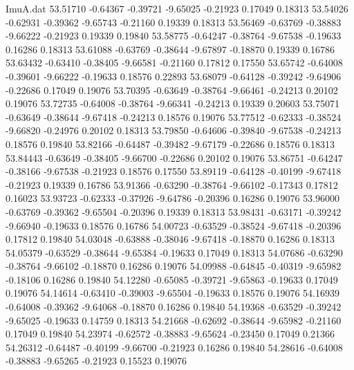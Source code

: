 \begin{filecontents}{ImuA.dat}
  53.51710   -0.64367   -0.39721   -9.65025   -0.21923    0.17049    0.18313
  53.54026   -0.62931   -0.39362   -9.65743   -0.21160    0.19339    0.18313
  53.56469   -0.63769   -0.38883   -9.66222   -0.21923    0.19339    0.19840
  53.58775   -0.64247   -0.38764   -9.67538   -0.19633    0.16286    0.18313
  53.61088   -0.63769   -0.38644   -9.67897   -0.18870    0.19339    0.16786
  53.63432   -0.63410   -0.38405   -9.66581   -0.21160    0.17812    0.17550
  53.65742   -0.64008   -0.39601   -9.66222   -0.19633    0.18576    0.22893
  53.68079   -0.64128   -0.39242   -9.64906   -0.22686    0.17049    0.19076
  53.70395   -0.63649   -0.38764   -9.66461   -0.24213    0.20102    0.19076
  53.72735   -0.64008   -0.38764   -9.66341   -0.24213    0.19339    0.20603
  53.75071   -0.63649   -0.38644   -9.67418   -0.24213    0.18576    0.19076
  53.77512   -0.62333   -0.38524   -9.66820   -0.24976    0.20102    0.18313
  53.79850   -0.64606   -0.39840   -9.67538   -0.24213    0.18576    0.19840
  53.82166   -0.64487   -0.39482   -9.67179   -0.22686    0.18576    0.18313
  53.84443   -0.63649   -0.38405   -9.66700   -0.22686    0.20102    0.19076
  53.86751   -0.64247   -0.38166   -9.67538   -0.21923    0.18576    0.17550
  53.89119   -0.64128   -0.40199   -9.67418   -0.21923    0.19339    0.16786
  53.91366   -0.63290   -0.38764   -9.66102   -0.17343    0.17812    0.16023
  53.93723   -0.62333   -0.37926   -9.64786   -0.20396    0.16286    0.19076
  53.96000   -0.63769   -0.39362   -9.65504   -0.20396    0.19339    0.18313
  53.98431   -0.63171   -0.39242   -9.66940   -0.19633    0.18576    0.16786
  54.00723   -0.63529   -0.38524   -9.67418   -0.20396    0.17812    0.19840
  54.03048   -0.63888   -0.38046   -9.67418   -0.18870    0.16286    0.18313
  54.05379   -0.63529   -0.38644   -9.65384   -0.19633    0.17049    0.18313
  54.07686   -0.63290   -0.38764   -9.66102   -0.18870    0.16286    0.19076
  54.09988   -0.64845   -0.40319   -9.65982   -0.18106    0.16286    0.19840
  54.12280   -0.65085   -0.39721   -9.65863   -0.19633    0.17049    0.19076
  54.14614   -0.63410   -0.39003   -9.65504   -0.19633    0.18576    0.19076
  54.16939   -0.64008   -0.39362   -9.64068   -0.18870    0.16286    0.19840
  54.19368   -0.63529   -0.39242   -9.65025   -0.19633    0.14759    0.18313
  54.21668   -0.62692   -0.38644   -9.65982   -0.21160    0.17049    0.19840
  54.23974   -0.62572   -0.38883   -9.65624   -0.23450    0.17049    0.21366
  54.26312   -0.64487   -0.40199   -9.66700   -0.21923    0.16286    0.19840
  54.28616   -0.64008   -0.38883   -9.65265   -0.21923    0.15523    0.19076

\end{filecontents}
